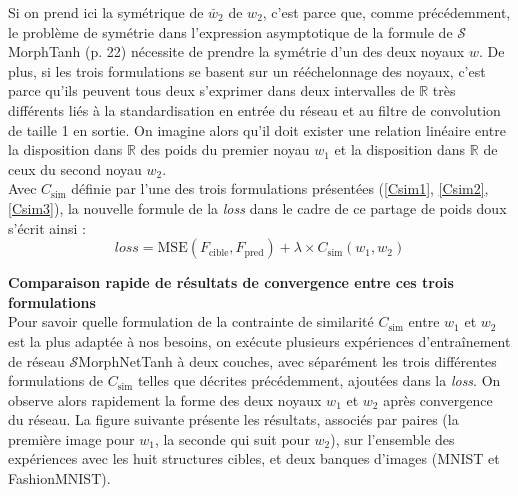 \vspace{-1.5mm}
\noindent Si on prend ici la symétrique de $\breve{w_2}$ de $w_2$, c'est parce que, comme précédemment, le problème de symétrie dans l'expression asymptotique de la formule de $\mathcal{S}$MorphTanh (p. 22) nécessite de prendre la symétrie d'un des deux noyaux $w$. 
De plus, si les trois formulations se basent sur un rééchelonnage des noyaux, c'est parce qu'ils peuvent tous deux s'exprimer dans deux intervalles de $\mathbb{R}$ très différents liés à la standardisation en entrée du réseau et au filtre de convolution de taille 1 en sortie. On imagine alors qu'il doit exister une relation linéaire entre la disposition dans $\mathbb{R}$ des poids du premier noyau $w_1$ et la disposition dans $\mathbb{R}$ de ceux du second noyau $w_2$. \\

\vspace{-0.1mm}
\noindent Avec $C_\text{sim}$ définie par l'une des trois formulations présentées (\ref{Csim1}, \ref{Csim2}, \ref{Csim3}), la nouvelle formule de la \textit{loss} dans le cadre de ce partage de poids doux s'écrit ainsi : \\

\vspace{-4.0mm}
\begin{equation}
    \textit{loss} = \text{MSE} \left ( F_\text{cible},F_\text{pred} \right ) + \lambda \times C_\text{sim}(w_1,w_2)
    \label{MSEpConstraintFilters}
\end{equation}


\newpage

\noindent \textbf{Comparaison rapide de résultats de convergence entre ces trois formulations} \\

Pour savoir quelle formulation de la contrainte de similarité $C_\text{sim}$ entre $w_1$ et $w_2$ est la plus adaptée à nos besoins, on exécute plusieurs expériences d'entraînement de réseau $\mathcal{S}$MorphNetTanh à deux couches, avec séparément les trois différentes formulations de $C_\text{sim}$ telles que décrites précédemment, ajoutées dans la \textit{loss}. On observe alors rapidement la forme des deux noyaux $w_1$ et $w_2$ après convergence du réseau. La figure suivante présente les résultats, associés par paires (la première image pour $w_1$, la seconde qui suit pour $w_2$), sur l'ensemble des expériences avec les huit structures cibles, et deux banques d'images (MNIST et FashionMNIST). \\

